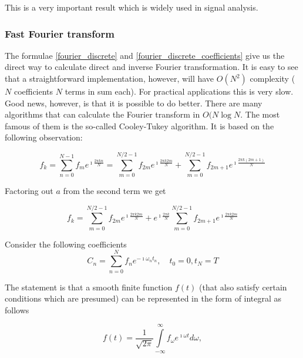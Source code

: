 \documentclass[11pt]{book}
\begin{document}
This is a very important result which is widely used in signal analysis. 

\subsubsection{Fast Fourier transform}

The formulae \eqref{fourier_discrete} and \eqref{fourier_discrete_coefficients} give us the direct way to calculate direct and inverse Fourier transformation. It is easy to see that a straightforward implementation, however, will have $O(N^2)$ complexity ( $N$ coefficients $N$ terms in sum each). For practical applications this is very slow. Good news, however, is that it is possible to do better. There are many algorithms that can calculate the Fourier transform in $O(N\operatorname{log}{N}$. The most famous of them is the so-called Cooley-Tukey algorithm. It is based on the following observation:


\begin{equation}
f_k = \sum\limits_{n=0}^{N-1} f_{m} e^{\imath \frac{2 \pi k n}{N}} = \sum\limits_{m=0}^{N/2 -1} f_{2m} e^{\imath \frac{2 \pi k 2 m}{N}} + \sum\limits_{m = 0}^{N / 2-1} f_{2m+1} e^{\imath \frac{2 \pi k (2 m + 1)}{N}}
\end{equation}

Factoring out $a$ from the second term we get

\begin{equation}
f_k =  \sum\limits_{m=0}^{N/2 -1} f_{2m} e^{\imath \frac{2 \pi k 2 m}{N}} + e^{\imath \frac{2 \pi k}{N}}\sum\limits_{m = 0}^{N / 2 - 1} f_{2m+1} e^{\imath \frac{2 \pi k 2 m }{N}}
\end{equation}











Consider the following coefficients 
\begin{equation}
C_n = \sum\limits_{n=0}^{N} f_n e^{-\imath \omega _n t_n}, \quad t_0 = 0, t_N = T
\end{equation}




The statement is that a  smooth finite function $f(t)$ (that also satisfy certain conditions which are presumed) can be represented in the form of integral as follows 

\begin{equation}
f(t) = \frac{1}{\sqrt{2\pi}}\int\limits_{-\infty}^\infty f_{\omega} e^{\imath\omega t} d\omega, 
\end{equation}  
\end{document}
